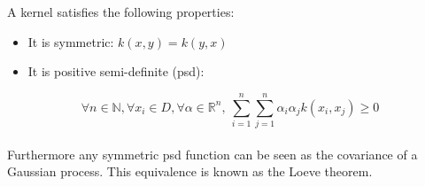 \begin{frame}{}
A kernel satisfies the following properties:
\begin{itemize}
	\item It is symmetric: $k(x,y) = k(y,x)$
	\item It is positive semi-definite (psd):
\end{itemize}
\begin{equation*}
	\forall n \in \mathds{N}, \forall x_i \in D, \forall \alpha \in \mathds{R}^n,\  \sum_{i=1}^n \sum_{j=1}^n \alpha_i \alpha_j k(x_i,x_j) \geq 0
\end{equation*}
\vspace{5mm} \\
Furthermore any symmetric psd function can be seen as the covariance of a Gaussian process. This equivalence is known as the Loeve theorem.
\end{frame}


